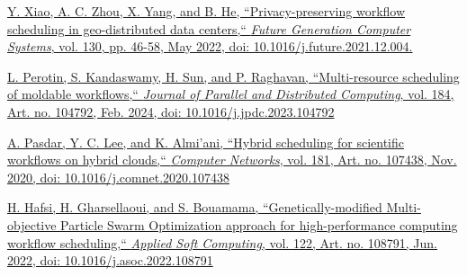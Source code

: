 \documentclass[a4paper, final]{article}
\begin{document}
\begin{thebibliography}{0}
	\href{https://doi.org/10.1016/j.future.2021.12.004}{
    Y. Xiao, A. C. Zhou, X. Yang, and B. He,
    ``Privacy-preserving workflow scheduling in geo-distributed data centers,``
    \textit{Future Generation Computer Systems}, vol. 130, pp. 46-58, May 2022,
    doi: 10.1016/j.future.2021.12.004.
    }

	\href{https://doi.org/10.1016/j.jpdc.2023.104792}{
    L. Perotin, S. Kandaswamy, H. Sun, and P. Raghavan,
    ``Multi-resource scheduling of moldable workflows,``  
    \textit{Journal of Parallel and Distributed Computing}, vol. 184, Art. no. 104792, Feb. 2024,
    doi: 10.1016/j.jpdc.2023.104792
    }

	\href{https://doi.org/10.1016/j.comnet.2020.107438}{
    A. Pasdar, Y. C. Lee, and K. Almi’ani,
    ``Hybrid scheduling for scientific workflows on hybrid clouds,``
    \textit{Computer Networks}, vol. 181, Art. no. 107438, Nov. 2020,
    doi: 10.1016/j.comnet.2020.107438
    }

	\href{https://doi.org/10.1016/j.asoc.2022.108791}{
    H. Hafsi, H. Gharsellaoui, and S. Bouamama,
    ``Genetically-modified Multi-objective Particle Swarm Optimization approach for high-performance 
    computing workflow scheduling,``
    \textit{Applied Soft Computing}, vol. 122, Art. no. 108791, Jun. 2022,
    doi: 10.1016/j.asoc.2022.108791
    }
\end{thebibliography}

\newpage
\end{document}
